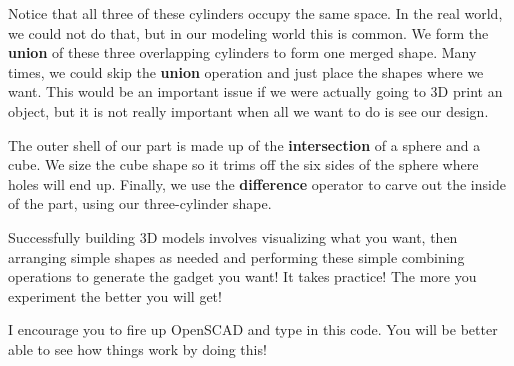 Notice that all three of these cylinders occupy the same space. In the real
world, we could not do that, but in our modeling world this is common. We form
the {\bf union} of these three overlapping cylinders to form one merged shape.
Many times, we could skip the {\bf union} operation and just place the shapes where
we want. This would be an important issue if we were actually going to 3D print
an object, but it is not really important when all we want to do is see our
design.

The outer shell of our part is made up of the {\bf intersection} of a sphere
and a cube. We size the cube shape so it trims off the six sides of the sphere
where holes will end up.  Finally, we use the {\bf difference} operator to
carve out the inside of the part, using our three-cylinder shape.

Successfully building 3D models involves visualizing what you want, then
arranging simple shapes as needed and performing these simple combining
operations to generate the gadget you want! It takes practice! The more you
experiment the better you will get!

I encourage you to fire up OpenSCAD and type in this code. You will be better
able to see how things work by doing this!
